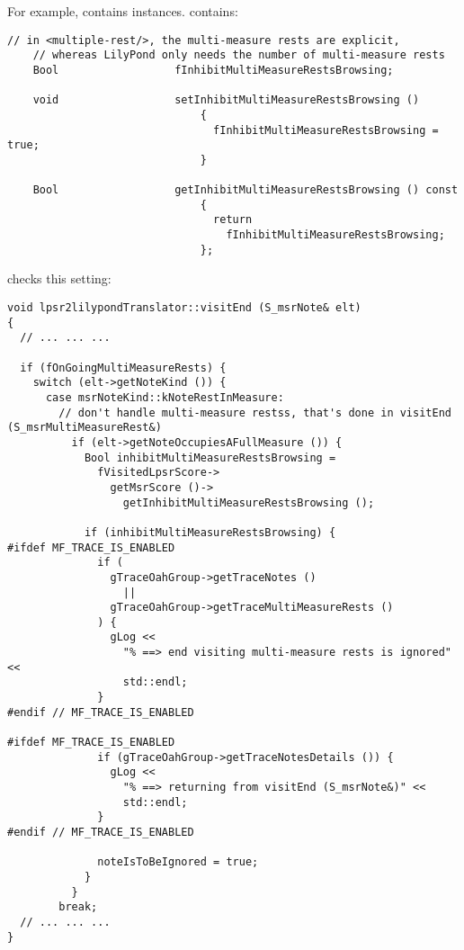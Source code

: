 For example,  contains  instances.  contains:
\begin{lstlisting}[language=CPlusPlus]
    // in <multiple-rest/>, the multi-measure rests are explicit,
    // whereas LilyPond only needs the number of multi-measure rests
    Bool                  fInhibitMultiMeasureRestsBrowsing;

    void                  setInhibitMultiMeasureRestsBrowsing ()
                              {
                                fInhibitMultiMeasureRestsBrowsing = true;
                              }

    Bool                  getInhibitMultiMeasureRestsBrowsing () const
                              {
                                return
                                  fInhibitMultiMeasureRestsBrowsing;
                              };
\end{lstlisting}

 checks this setting:
\begin{lstlisting}[language=CPlusPlus]
void lpsr2lilypondTranslator::visitEnd (S_msrNote& elt)
{
  // ... ... ...

  if (fOnGoingMultiMeasureRests) {
    switch (elt->getNoteKind ()) {
      case msrNoteKind::kNoteRestInMeasure:
        // don't handle multi-measure restss, that's done in visitEnd (S_msrMultiMeasureRest&)
          if (elt->getNoteOccupiesAFullMeasure ()) {
            Bool inhibitMultiMeasureRestsBrowsing =
              fVisitedLpsrScore->
                getMsrScore ()->
                  getInhibitMultiMeasureRestsBrowsing ();

            if (inhibitMultiMeasureRestsBrowsing) {
#ifdef MF_TRACE_IS_ENABLED
              if (
                gTraceOahGroup->getTraceNotes ()
                  ||
                gTraceOahGroup->getTraceMultiMeasureRests ()
              ) {
                gLog <<
                  "% ==> end visiting multi-measure rests is ignored" <<
                  std::endl;
              }
#endif // MF_TRACE_IS_ENABLED

#ifdef MF_TRACE_IS_ENABLED
              if (gTraceOahGroup->getTraceNotesDetails ()) {
                gLog <<
                  "% ==> returning from visitEnd (S_msrNote&)" <<
                  std::endl;
              }
#endif // MF_TRACE_IS_ENABLED

              noteIsToBeIgnored = true;
            }
          }
        break;
  // ... ... ...
}
\end{lstlisting}

